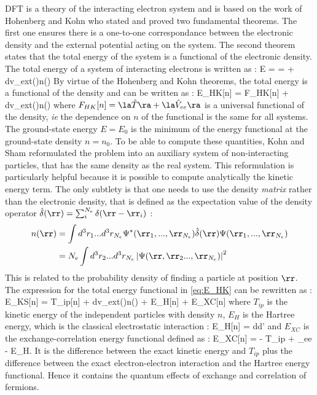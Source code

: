 \gls{DFT} is a theory of the interacting electron system and is based on the work of Hohenberg and Kohn who stated and proved two fundamental theorems. \cite{hohenberg1964} The first one ensures there is a one-to-one correspondance between the electronic density and the external potential acting on the system. The second theorem states that the total energy of the system is a functional of the electronic density.
The total energy of a system of interacting electrons is written as :
\be
	E =  =  + \int d\rr v_{ext}(\rr)n(\rr)
\ee
By virtue of the Hohenberg and Kohn theorems, the total energy is a functional of the density and can be written as :
\be
 	E_{HK}[n] = F_{HK}[n] + \int d\rr v_{ext}(\rr)n(\rr)
	\label{eq:E_HK}
\ee
where $F_{HK}[n] = \la \hat{T} \ra + \la \hat{V}_{ee} \ra$ is a universal functional of the density, \emph{ie} the dependence on $n$ of the functional is the same for all systems. The ground-state energy $E = E_0$ is the minimum of the energy functional at the ground-state density $n=n_0$. To be able to compute these quantities, Kohn and Sham reformulated the problem into an auxiliary system of non-interacting particles, that has the same density as the real system. This reformulation is particularly helpful because it is possible to compute analytically the kinetic energy term. The only subtlety is that one needs to use the density \emph{matrix} rather than the electronic density, that is defined as the expectation value of the density operator $\hat{\delta}(\rr) = \sum_i^{N_{e}} \delta(\rr - \rr_i)$ :
\begin{align}
\begin{split}
	n(\rr) &= \int d^3r_1 ... d^3r_{N_{e}} \Psi^*(\rr_1,...,\rr_{N_{e}})
	\hat{\delta}(\rr) \Psi(\rr_1,...,\rr_{N_{e}}) \\
	&= N_{e}\int d^3r_2 ... d^3r_{N_{e}} \left| \Psi(\rr,\rr_2...,\rr_{N_{e}})\right|^2
\end{split}
\end{align}
This is related to the probability density of finding a particle at position $\rr$.
The expression for the total energy functional in \eqref{eq:E_HK} can be rewritten as :
\be
	E_{KS}[n] = T_{ip}[n] + \int d\rr v_{ext}(\rr)n(\rr) + E_H[n] + E_{XC}[n]
\ee
where $T_{ip}$ is the kinetic energy of the independent particles with density $n$, $E_H$ is the Hartree energy, which is the classical electrostatic interaction :
\be
	E_H[n] = \int d\rr d\rr' 
	\label{eq:E_Hartree}
\ee
and $E_{XC}$ is the exchange-correlation energy functional defined as :
\be
	E_{XC}[n] = \langle {} \rangle - T_{ip} + \langle {}_{ee} \rangle - E_H.
\ee
It is the difference between the exact kinetic energy and $T_{ip}$ plus the difference between the exact electron-electron interaction and the Hartree energy functional. Hence it contains the quantum effects of exchange and correlation of fermions.

